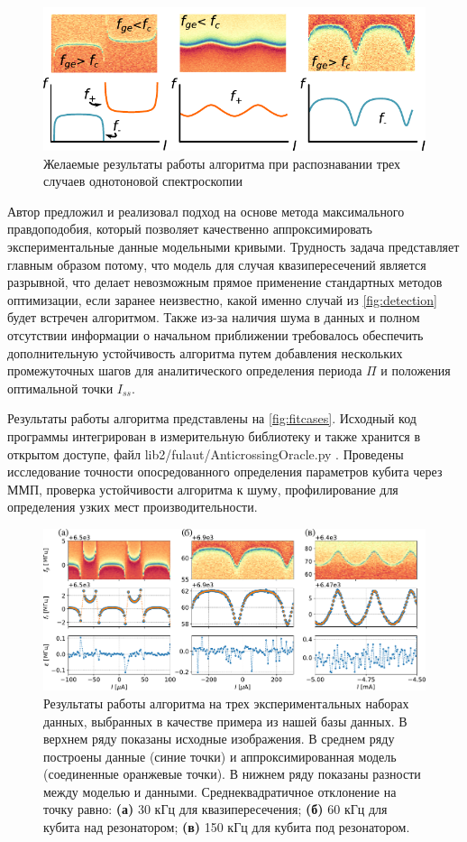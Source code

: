 \documentclass[14pt, a4paper]{extarticle}
\begin{document}
	
	\begin{figure}
		\centering
		\includegraphics[width=.8\linewidth]{Pictures/detection}
		\caption{Желаемые результаты работы алгоритма при распознавании трех случаев однотоновой спектроскопии}
		\label{fig:detection}
	\end{figure}

Автор предложил и реализовал подход на основе метода максимального правдоподобия, который позволяет качественно аппроксимировать экспериментальные данные модельными кривыми. Трудность задача представляет главным образом потому, что модель для случая квазипересечений является разрывной, что делает невозможным прямое применение стандартных методов оптимизации, если заранее неизвестно, какой именно случай из \autoref{fig:detection} будет встречен алгоритмом. Также из-за наличия шума в данных и полном отсутствии информации о начальном приближении требовалось обеспечить дополнительную устойчивость алгоритма путем добавления нескольких промежуточных шагов для аналитического определения периода $\Pi$ и положения оптимальной точки $I_{ss}$. 

Результаты работы алгоритма представлены на \autoref{fig:fitcases}. Исходный код программы интегрирован в измерительную библиотеку и также хранится в открытом доступе, файл \foreignlanguage{english}{lib2/fulaut/AnticrossingOracle.py} \cite{fedorov2021github}. Проведены исследование точности опосредованного определения параметров кубита через ММП, проверка устойчивости алгоритма к шуму, профилирование для определения узких мест производительности.

\begin{figure}
	\centering
	\includegraphics[width=1\linewidth]{Pictures/fit_cases}
	\caption{Результаты работы алгоритма на трех экспериментальных наборах данных, выбранных в качестве примера из нашей базы данных. В верхнем ряду показаны исходные изображения. В среднем ряду построены данные (синие точки) и аппроксимированная модель (соединенные оранжевые точки). В нижнем ряду показаны разности между моделью и данными. Среднеквадратичное отклонение на точку равно: \textbf{(а)} 30 кГц для квазипересечения; \textbf{(б)} 60 кГц для кубита над резонатором; \textbf{(в)} 150 кГц для кубита под резонатором.}
	\label{fig:fitcases}
\end{figure}
\end{document}
